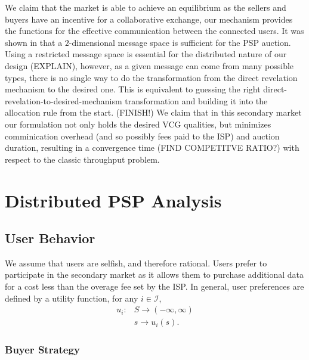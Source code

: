 \documentclass[12pt]{article}
\theoremstyle{definition}
\newcommand{\mcI}{\mathcal{I}}
\begin{document}
\begin{multicols}{2}
We claim that the market is
able to achieve an equilibrium as the sellers and buyers have an
incentive for a collaborative exchange, our mechanism provides the functions
for the effective communication between the connected users. It was shown in
\cite{lazar} that a $2$-dimensional message space is sufficient for the PSP
auction. Using a restricted message space is essential for the distributed
nature of our design (EXPLAIN), however, as a given message can come from many
possible types, there is no single
way to do the transformation from the direct revelation mechanism to the
desired one. This is equivalent to guessing the
right direct-revelation-to-desired-mechanism transformation and building it
into the allocation rule from the start. (FINISH!)
We claim that in
this secondary market our formulation not only holds the desired VCG qualities,
but minimizes comminication overhead (and so possibly fees paid to the ISP)
and auction duration, resulting in a convergence time (FIND COMPETITVE RATIO?)
with respect to the classic throughput problem. 



\section{Distributed PSP Analysis}

\subsection{User Behavior}

We assume that users are selfish, and therefore
rational. Users prefer to participate in the secondary market as it allows them to purchase
additional data for a cost less than the overage fee set by the ISP. 
In general, user preferences are defined by a utility function, for any $i\in\mcI$,
\begin{align*}
    u_i : &S \rightarrow (-\infty, \infty) \\
          &s \rightarrow u_i(s).
\end{align*}

\subsubsection{Buyer Strategy}


\end{multicols}
\end{document}
